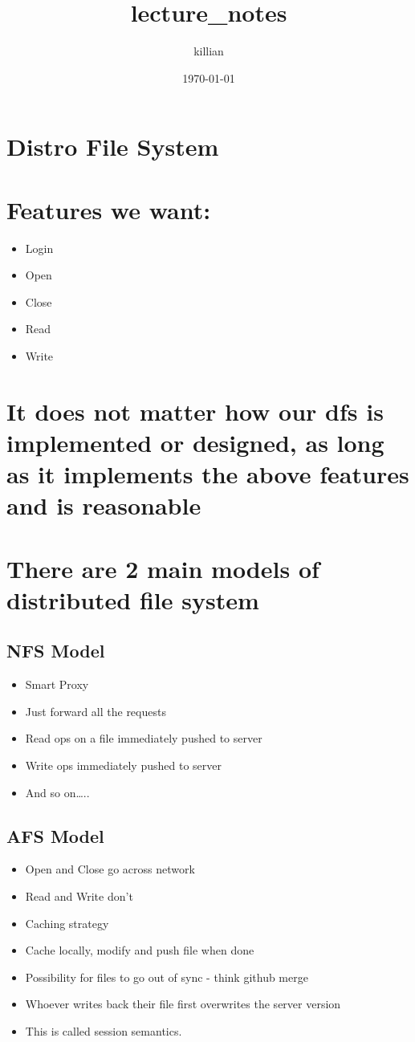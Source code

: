 \documentclass[11pt]{article}
\author{killian}
\date{\today}
\title{lecture\_notes}
\begin{document}
\maketitle
\section{Distro File System}
\label{sec-1}

\section{Features we want:}
\label{sec-2}
\begin{itemize}
\item Login
\item Open
\item Close
\item Read
\item Write
\end{itemize}

\section{It does not matter how our dfs is implemented or designed, as long as it implements the above features and is reasonable}
\label{sec-3}


\section{There are 2 main models of distributed file system}
\label{sec-4}

\subsection{NFS Model}
\label{sec-4-1}
\begin{itemize}
\item Smart Proxy
\item Just forward all the requests
\item Read ops on a file immediately pushed to server
\item Write ops immediately pushed to server
\item And so on\ldots{}..
\end{itemize}

\subsection{AFS Model}
\label{sec-4-2}
\begin{itemize}
\item Open and Close go across network
\item Read and Write don't
\item Caching strategy
\item Cache locally, modify and push file when done
\item Possibility for files to go out of sync - think github merge
\item Whoever writes back their file first overwrites the server version
\item This is called session semantics.
\end{itemize}
\end{document}

